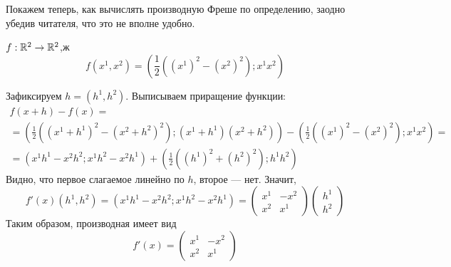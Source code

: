Покажем теперь, как вычислять производную Фреше по определению, заодно убедив читателя, что это не вполне удобно.
\begin{primer}
$f:\mathbb{R}^2 \to \mathbb{R}^2$,ж
$$f(x^1,x^2)=\left(\frac{1}{2}\left((x^1)^2-(x^2)^2\right); x^1 x^2\right)$$

Зафиксируем $h=(h^1, h^2)$.
Выписываем приращение функции:
\begin{multline}
f(x+h)-f(x)
=\\=
\left(\frac{1}{2}\left((x^1+h^1)^2-(x^2+h^2)^2\right); (x^1+h^1)( x^2+h^2) \right)-\left(\frac{1}{2}\left((x^1)^2-(x^2)^2\right); x^1 x^2\right)
=\\=
(x^1h^1-x^2h^2; x^1h^2-x^2h^1)+\left( \frac{1}{2}\left( (h^1)^2+(h^2)^2 \right); h^1 h^2 \right)
\end{multline}
Видно, что первое слагаемое линейно по $h$, второе --- нет.
Значит,
$$
f'(x)(h^1,h^2)=(x^1h^1-x^2h^2; x^1h^2-x^2h^1)=
\begin{pmatrix}
x^1 & -x^2\\
x^2 & x^1
\end{pmatrix}
\begin{pmatrix}
h^1\\
h^2
\end{pmatrix}
$$
Таким образом, производная имеет вид
$$
f'(x)=
\begin{pmatrix}
x^1 & -x^2\\
x^2 & x^1
\end{pmatrix}
$$
\end{primer}

